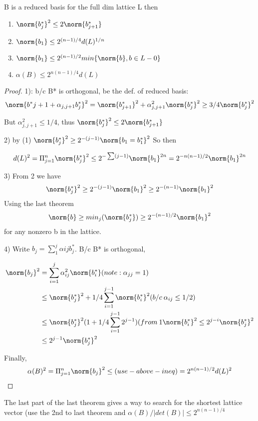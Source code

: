 \begin{theorem}
B is a reduced basis for the full dim lattice L then
\begin{enumerate}
	\item $\norm{b^*_j}^2 \leq 2 \norm{b^*_{j+1}}$
	\item $\norm{b_1} \leq 2^{(n-1)/4} d(L)^{1/n}$
	\item $\norm{b_1} \leq 2^{(n-1)/2} min\{\norm{b}, b \in L - 0\}$
	\item $\alpha(B) \leq 2^{n(n-1)/4} d(L)$
\end{enumerate}
\end{theorem}
\begin{proof}
1): b/c B* is orthogonal, be the def. of reduced basis: 
\[ \norm{b^*{j+1} + \alpha_{j,j+1}b^*_j}^2 = \norm{b^*_{j+1}}^2 + \alpha_{j,j+1}^2 \norm{b^*_j}^2 \geq 3/4 \norm{b^*_j}^2 \]

But $\alpha_{j,j+1}^2 \leq 1/4$, thus $\norm{b^*_j}^2 \leq 2 \norm{b^*_{j+1}}$

2) by (1) $\norm{b^*_j}^2 \geq 2^{-(j-1)} \norm{b_1 = b^*_1}^2$ So then

\[ d(L)^2 = \Pi_{j=1}^n \norm{b^*_j}^2 \leq 2^{-\sum (j-1)}\norm{b_1}^{2n} = 2^{-n(n-1)/2}\norm{b_1}^{2n}\]

3) From 2 we have \[ \norm{b^*_j}^2 \geq 2^{-(j-1)}\norm{b_1}^2 \geq 2^{-(n-1)}\norm{b_1}^2 \]
Using  the last theorem 
\[ \norm{b} \geq min_j(\norm{b^*_j}) \geq 2^{-(n-1)/2}\norm{b_1}^2\] for any nonzero b in the lattice.

4) Write $b_j = \sum_1^j \alpha{ij}b^*_j$. B/c B* is orthogonal,

\begin{align*}
 \norm{b_j}^2 &= \sum_{i=1}^j \alpha_{ij}^2 \norm{b^*_i} (note: \alpha_{jj} = 1)  \\
 	& \leq \norm{b^*_j}^2 + 1/4 \sum_{i=1}^{j-1}\norm{b^*_i}^2 (b/c\: \alpha_{ij} \leq 1/2) \\
	& \leq \norm{b^*_j}^2( 1 + 1/4 \sum_{i=1}^{j-1} 2^{j-1}) ( from\: 1 \norm{b^*_i}^2 \leq 2^{j-i}\norm{b^*_j}^2 \\
	& \leq 2^{j-1}\norm{b_j^*}^2
\end{align*}


Finally, 
\[ \alpha(B)^2 = \Pi_{j=1}^n \norm{b_j}^2 \leq (use-above-ineq) = 2^{n(n-1)/2}d(L)^2\]
\end{proof}


The last part of the last theorem gives a way to search for the shortest lattice vector (use the 2nd to last theorem and $\alpha(B)/|det(B)| \leq 2^{n(n-1)/4}$


